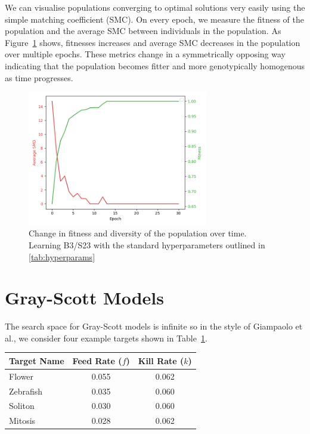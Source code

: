 We can visualise populations converging to optimal solutions very easily using the simple matching coefficient (SMC). On every epoch, we measure the fitness of the population and the average SMC between individuals in the population. As Figure~\ref{fig:smd} shows, fitnesses increases and average SMC decreases in the population over multiple epochs. These metrics change in a symmetrically opposing way indicating that the population becomes fitter and more genotypically homogenous as time progresses.

\begin{figure}[!h]
\centering
\includegraphics[width=0.7\textwidth]{images/smd.png}
\caption{Change in fitness and diversity of the population over time. Learning B3/S23 with the standard hyperparameters outlined in \ref{tab:hyperparams}}
\label{fig:smd}
\end{figure}

\section{Gray-Scott Models}

The search space for Gray-Scott models is infinite so in the style of Giampaolo et al.\cite{giampaolo2022physics}, we consider four example targets shown in Table~\ref{tab:gs-targets}.

\begin{table} 
    \centering
    \begin{tabular}{ |l|c|c| } 
        \hline
        Target Name & Feed Rate ($f$) & Kill Rate ($k$)\\
        \hline
        Flower & 0.055 & 0.062\\
        Zebrafish & 0.035 & 0.060\\
        Soliton & 0.030 & 0.060\\
        Mitosis & 0.028 & 0.062\\
        \hline
    \end{tabular}
\label{tab:gs-targets}
\end{table}

